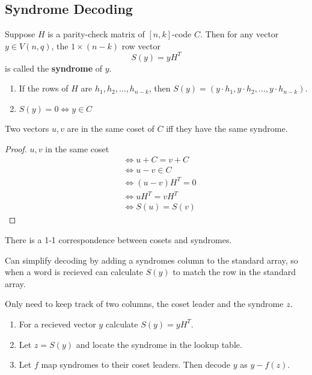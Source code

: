 \documentclass{article}
\begin{document}
\subsection{Syndrome Decoding}
\begin{definition}
  Suppose \( H \) is a parity-check matrix of \( [n, k] \)-code \( C \). Then for any vector \( y \in V(n, q) \), the \( 1 \times (n-k) \) row vector \[
    S(y) = yH^T
  \] is called the \textbf{syndrome} of \( y \).
\end{definition}
\begin{remark}
  \begin{enumerate}
    \item If the rows of \( H \) are \( h_1, h_2, \dots, h_{n-k}  \), then \( S(y) = (y \cdot h_1, y \cdot h_2, \dots, y \cdot h_{n-k} ) \).
    \item \( S(y) = 0 \iff y \in C \)
  \end{enumerate}
\end{remark}
\begin{lemma}
  Two vectors \( u, v \) are in  the same coset of \( C \) iff they have the same syndrome.
\end{lemma}
\begin{proof}
  \( u, v \) in the same coset \begin{align*}
     & \iff u + C = v + C \\
     & \iff u - v \in C   \\
     & \iff (u-v)H^T = 0  \\
     & \iff uH^T = vH^T   \\
     & \iff S(u) = S(v)
  \end{align*}
\end{proof}
\begin{corollary}
  There is a 1-1 correspondence between cosets and syndromes.
\end{corollary}
\begin{proposition}
  Can simplify decoding by adding a syndromes column to the standard array, so when a word is recieved can calculate \( S(y) \) to match the row in the standard array.
\end{proposition}
\begin{proposition}
  Only need to keep track of two columns, the coset leader and the syndrome \( z \).

  \begin{enumerate}
    \item For a recieved vector \( y \) calculate \( S(y) = yH^T \).
    \item Let \( z = S(y) \) and locate the syndrome in the lookup table.
    \item Let \( f \) map syndromes to their coset leaders. Then decode \( y \) as \( y - f(z) \).
  \end{enumerate}
\end{proposition}
\end{document}
